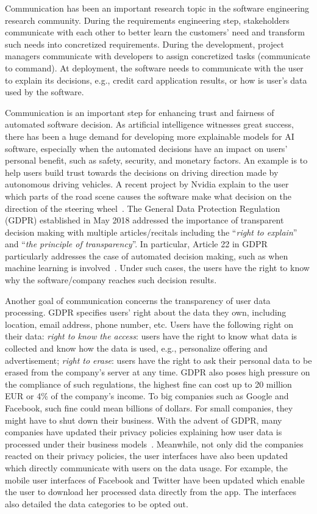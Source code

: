 Communication has been an important research topic in the software engineering research community. During the requirements engineering step, stakeholders communicate with each other to better learn the customers' need and transform such needs into concretized requirements. During the development, project managers communicate with developers to assign concretized tasks (communicate to command). At deployment, the software needs to communicate with the user to explain its decisions, e.g., credit card application results, or how is user's data used by the software. 

Communication is an important step for enhancing trust and fairness of automated software decision. As artificial intelligence witnesses great success, there has been a huge demand for developing more explainable models for AI software, especially when the automated decisions have an impact on users' personal benefit, such as safety, security, and monetary factors. An example is to help users build trust towards the decisions on driving direction made by autonomous driving vehicles. A recent project by Nvidia explain to the user which parts of the road scene causes the software make what decision on the direction of the steering wheel~\cite{explainableautonomousdriving}. The General Data Protection Regulation (GDPR) established in May 2018 addressed the importance of transparent decision making with multiple articles/recitals including the ``\textit{right to explain}'' and ``\textit{the principle of transparency}''. In particular, Article 22 in GDPR particularly addresses the case of automated decision making, such as when machine learning is involved~\cite{automateddecision}. Under such cases, the users have the right to know why the software/company reaches such decision results. 

Another goal of communication concerns the transparency of user data processing. GDPR specifies users' right about the data they own, including location, email address, phone number, etc. Users have the following right on their data: \textit{right to know the access}: users have the right to know what data is collected and know how the data is used, e.g., personalize offering and advertisement; \textit{right to erase}: users have the right to ask their personal data to be erased from the company's server at any time. GDPR also poses high pressure on the compliance of such regulations, the highest fine can cost up to 20 million EUR or 4\% of the company's income. To big companies such as Google and Facebook, such fine could mean billions of dollars. For small companies, they might have to shut down their business. With the advent of GDPR, many companies have updated their privacy policies explaining how user data is processed under their business models~\cite{degeling2018we}. Meanwhile, not only did the companies reacted on their privacy policies, the user interfaces have also been updated which directly communicate with users on the data usage. For example, the mobile user interfaces of Facebook and Twitter have been updated which enable the user to download her processed data directly from the app. The interfaces also detailed the data categories to be opted out. 

